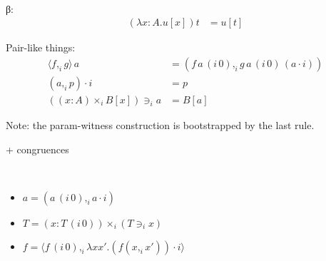 \documentclass[english]{PaperTools/latex/lipics}
\newcommand\CP[3]{(#2,_{#1} #3)}
\newcommand\CTimes[2]{(#2) ×_{#1}}
\newcommand\param[1]{\!\cdot\!#1}
\newcommand\op[1]{∋_{#1}}
\newcommand\fp[3]{⟨#2 ,_{#1} #3⟩}
\newcommand\mor[2]{({#1}\,{#2})}
\newcommand\proj[2]{{#2}\,\mor{#1}0}
\newcommand\comment[1]{}
\begin{document}
\comment{
\begin{definition}[Normal forms and neutral terms]~
  \begin{align*}
    \mathsf{Nf} ∋ u,v,A,B & \coloneqq
      U \mid λx:A. t \mid (x:A) → B \\
      & \mid \CP i u v \mid \fp i u v \\
      & \mid {(\CTimes {i₀} A B)} \op {i₁} {u_1 \cdots} \op {i_n} {u_n} &\quad \text{($i₀ \prec i₁ \prec \ldots \prec i_n$)} \\
      & \mid s \param {i₀} \cdots \param {i_{n-1}}                  &\quad \text{($i₀ \prec   < \ldots \prec i_{n-1}$)}
    \\
    \mathsf{Ne} ∋ s & \coloneqq x \mid s \, u
  \end{align*}
\end{definition}
}

\begin{definition}[Conversion]~
\label{def:conversion}

β:
\begin{align*}
  (λx:A. u[x]) t &= u[t]
\end{align*}

Pair-like things:
\begin{align*}
  {\fp i f g} \, a      &= (f\,{\proj i a} ,_i g\,{\proj i a}\,{(a \param i)}) \\
  {(a,_i p)} \param i   &= p \\
  {(\CTimes i {x:A} B[x])} \op i a &= B[a]
\end{align*}

Note: the param-witness construction is bootstrapped by the last rule.

  + congruences
\end{definition}

\begin{corollary}~
  \label{cor:equalities}
  \begin{itemize}
  \item $a = \CP i {\proj i a} {a \param i}$
  \item $T = \CTimes i {x:\proj i T} {(T \op i x)}$
  \item $f = \fp i {\proj i f} {λx x'. (f \CP i x {x'}) \param i}$
  \end{itemize}
\end{corollary}
\end{document}
